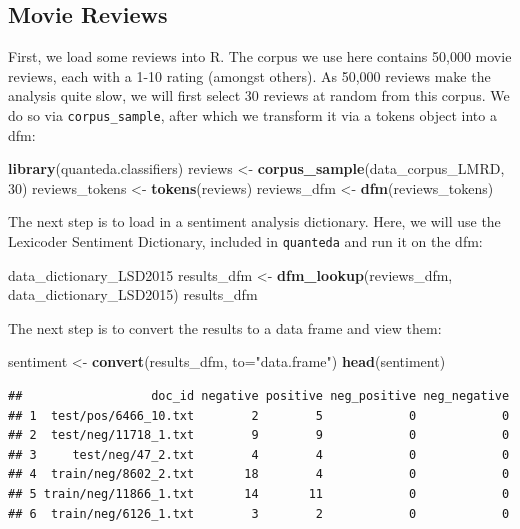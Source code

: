 \documentclass[
]{book}
\newenvironment{Shaded}{\begin{snugshade}}{\end{snugshade}}
\newcommand{\AttributeTok}[1]{\textcolor[rgb]{0.13,0.29,0.53}{#1}}
\newcommand{\DecValTok}[1]{\textcolor[rgb]{0.00,0.00,0.81}{#1}}
\newcommand{\FunctionTok}[1]{\textcolor[rgb]{0.13,0.29,0.53}{\textbf{#1}}}
\newcommand{\NormalTok}[1]{#1}
\newcommand{\OtherTok}[1]{\textcolor[rgb]{0.56,0.35,0.01}{#1}}
\newcommand{\StringTok}[1]{\textcolor[rgb]{0.31,0.60,0.02}{#1}}
\begin{document}
\subsection{Movie Reviews}\label{movie-reviews}

First, we load some reviews into R. The corpus we use here contains 50,000 movie reviews, each with a 1-10 rating (amongst others). As 50,000 reviews make the analysis quite slow, we will first select 30 reviews at random from this corpus. We do so via \texttt{corpus\_sample}, after which we transform it via a tokens object into a dfm:

\begin{Shaded}
\begin{Highlighting}[]
\FunctionTok{library}\NormalTok{(quanteda.classifiers)}
\NormalTok{reviews }\OtherTok{\textless{}{-}} \FunctionTok{corpus\_sample}\NormalTok{(data\_corpus\_LMRD, }\DecValTok{30}\NormalTok{)}
\NormalTok{reviews\_tokens }\OtherTok{\textless{}{-}} \FunctionTok{tokens}\NormalTok{(reviews)}
\NormalTok{reviews\_dfm }\OtherTok{\textless{}{-}} \FunctionTok{dfm}\NormalTok{(reviews\_tokens)}
\end{Highlighting}
\end{Shaded}

The next step is to load in a sentiment analysis dictionary. Here, we will use the Lexicoder Sentiment Dictionary, included in \texttt{quanteda} and run it on the dfm:

\begin{Shaded}
\begin{Highlighting}[]
\NormalTok{data\_dictionary\_LSD2015}
\NormalTok{results\_dfm }\OtherTok{\textless{}{-}} \FunctionTok{dfm\_lookup}\NormalTok{(reviews\_dfm, data\_dictionary\_LSD2015)}
\NormalTok{results\_dfm}
\end{Highlighting}
\end{Shaded}

The next step is to convert the results to a data frame and view them:

\begin{Shaded}
\begin{Highlighting}[]
\NormalTok{sentiment }\OtherTok{\textless{}{-}} \FunctionTok{convert}\NormalTok{(results\_dfm, }\AttributeTok{to=}\StringTok{"data.frame"}\NormalTok{)}
\FunctionTok{head}\NormalTok{(sentiment)}
\end{Highlighting}
\end{Shaded}

\begin{verbatim}
##                  doc_id negative positive neg_positive neg_negative
## 1  test/pos/6466_10.txt        2        5            0            0
## 2  test/neg/11718_1.txt        9        9            0            0
## 3     test/neg/47_2.txt        4        4            0            0
## 4  train/neg/8602_2.txt       18        4            0            0
## 5 train/neg/11866_1.txt       14       11            0            0
## 6  train/neg/6126_1.txt        3        2            0            0
\end{verbatim}
\end{document}
